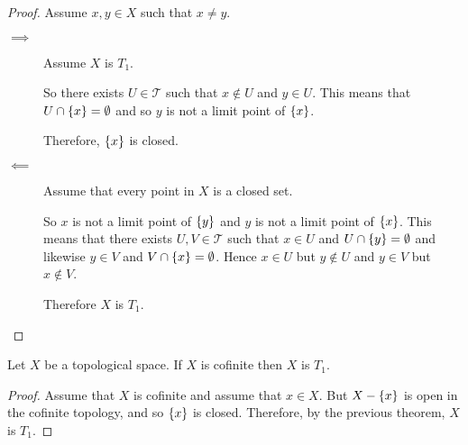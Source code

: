 \documentclass[letterpaper,12pt,fleqn]{article}
\newcommand{\T}{\mathscr{T}}
\begin{document}
\begin{proof}
  Assume \(x,y\in X\) such that \(x\ne y\).

  \begin{description}
  \item[\(\implies\)] Assume \(X\) is \(T_1\).

    So there exists \(U\in\T\) such that \(x\notin U\) and \(y\in U\).  This means that \(U\cap\{x\}=\emptyset\)
    and so \(y\) is not a limit point of \(\{x\}\).

    Therefore, \(\{x\}\) is closed.

  \item[\(\impliedby\)] Assume that every point in \(X\) is a closed set.

    So \(x\) is not a limit point of \(\{y\}\) and \(y\) is not a limit point of \(\{x\}\).  This means that
    there exists \(U,V\in\T\) such that \(x\in U\) and \(U\cap\{y\}=\emptyset\) and likewise \(y\in V\) and
    \(V\cap\{x\}=\emptyset\).  Hence \(x\in U\) but \(y\notin U\) and \(y\in V\) but \(x\notin V\).

    Therefore \(X\) is \(T_1\).
  \end{description}
\end{proof}

\begin{theorem}[Exercise 4.2]
  Let \(X\) be a topological space.  If \(X\) is cofinite then \(X\) is \(T_1\).
\end{theorem}

\begin{proof}
  Assume that \(X\) is cofinite and assume that \(x\in X\).  But \(X-\{x\}\) is open in the cofinite topology, and
  so \(\{x\}\) is closed.  Therefore, by the previous theorem, \(X\) is \(T_1\).
\end{proof}
\end{document}
